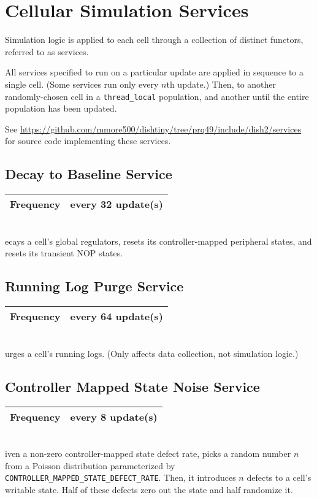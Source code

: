 \newcommand{\cellsimservicedef}[2]{
    \begin{tabular}{|
        >{\columncolor[HTML]{C0C0C0}}l |l|}
        \hline
        Frequency & every #1 update(s) \\ \hline
    \end{tabular} \\
}

\section{Cellular Simulation Services}

Simulation logic is applied to each cell through a collection of distinct functors, referred to as services.

All services specified to run on a particular update are applied in sequence to a single cell.
(Some services run only every $n$th update.)
Then, to another randomly-chosen cell in a \texttt{thread\_local} population, and another until the entire population has been updated.

See \url{https://github.com/mmore500/dishtiny/tree/prq49/include/dish2/services} for source code implementing these services.

\subsection{Decay to Baseline Service}

\cellsimservicedef{32}

Decays a cell's global regulators, resets its controller-mapped peripheral states, and resets its transient NOP states.

\subsection{Running Log Purge Service}

\cellsimservicedef{64}

Purges a cell's running logs.
(Only affects data collection, not simulation logic.)

\subsection{Controller Mapped State Noise Service}

\cellsimservicedef{8}

Given a non-zero controller-mapped state defect rate, picks a random number $n$ from a Poisson distribution parameterized by \texttt{CONTROLLER\_MAPPED\_STATE\_DEFECT\_RATE}.
Then, it introduces $n$ defects to a cell's writable state.
Half of these defects zero out the state and half randomize it.

